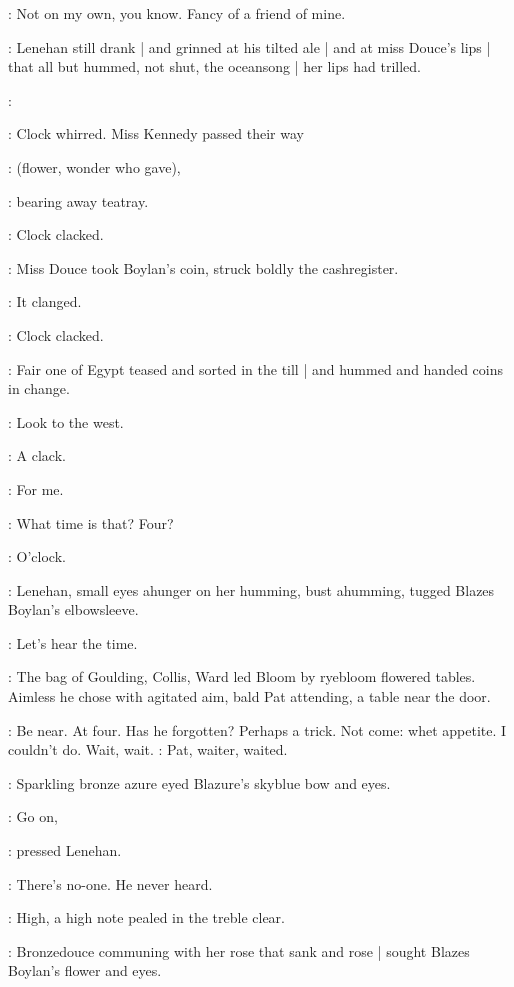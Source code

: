 \boylan:
Not on my own,
you know.
Fancy of a friend of mine.

:
Lenehan still drank |
and grinned at his tilted ale |
and at miss Douce's lips |
that all but hummed,
not shut,
the oceansong |
her lips had trilled.

\MissD:

:
Clock whirred.
Miss Kennedy passed their way

\BloomInt:
(flower,
wonder who gave),

:
bearing away teatray.

:
Clock clacked.

:
Miss Douce took Boylan's coin,
struck boldly the cashregister.

:
It clanged.

:
Clock clacked.

:
Fair one of Egypt teased and sorted in the till |
and hummed and handed coins in change.

\BloomInt:
Look to the west.

:
A clack.

\BloomInt:
For me.

\boylan:
What time is that?
Four?

:
O'clock.

:
Lenehan,
small eyes ahunger on her humming,
bust ahumming,
tugged Blazes Boylan's elbowsleeve.

\lenehan:
Let's hear the time.


:
The bag of Goulding,
Collis,
Ward
led Bloom by ryebloom flowered tables.
Aimless he chose with agitated aim,
bald Pat attending,
a table near the door.

\BloomInt:
Be near.
At four.
Has he forgotten?
Perhaps a trick.
Not come:
whet appetite.
I couldn't do.
Wait,
wait.
:
Pat,
waiter,
waited.

:
Sparkling bronze azure eyed Blazure's skyblue bow and eyes.

\lenehan:
Go on,

:
pressed Lenehan.

\lenehan:
There's no-one.
He never heard.


:
High,
a high note pealed in the treble clear.

:
Bronzedouce communing with her rose that sank and rose |
sought Blazes Boylan's flower and eyes.


